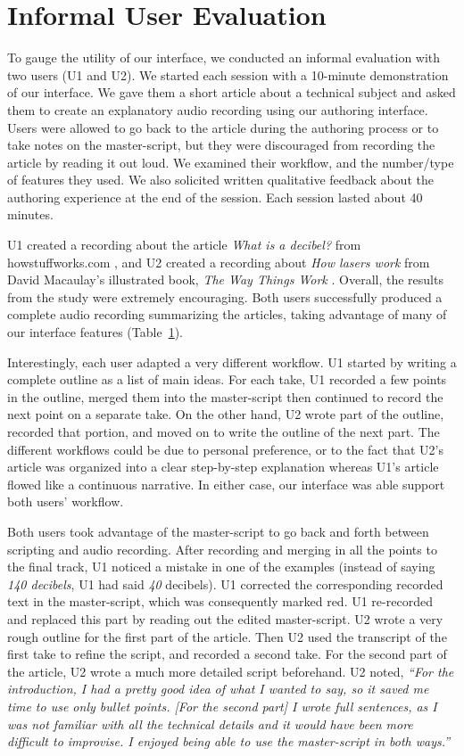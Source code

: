 \section{Informal User Evaluation}

To gauge the utility of our interface, we conducted an informal evaluation with two users (U1 and U2). We started each session with a 10-minute demonstration of our interface. We gave them a short article about a technical subject and asked them to create an explanatory audio recording using our authoring interface. Users were allowed to go back to the article during the authoring process or to take notes on the master-script, but they were discouraged from recording the article by reading it out loud. We examined their workflow, and the number/type of features they used. We also solicited written qualitative feedback about the authoring experience at the end of the session. Each session lasted about 40 minutes.

U1 created a recording about the article \textit{What is a decibel? } from howstuffworks.com \cite{}, and U2 created a recording about \textit{How lasers work} from David Macaulay's illustrated book, \textit{The Way Things Work} \cite{}. Overall, the results from the study were extremely encouraging. Both users successfully produced a complete audio recording summarizing the articles, taking advantage of many of our interface features (Table~\ref{}). 

Interestingly, each user adapted a very different workflow. U1 started by writing a complete outline as a list of main ideas. For each take, U1 recorded a few points in the outline, merged them into the master-script then continued to record the next point on a separate take. On the other hand, U2 wrote part of the outline, recorded that portion, and moved on to write the outline of the next part. The different workflows could be due to personal preference, or  to the fact that U2's article was organized into a clear step-by-step explanation whereas U1's article flowed like a continuous narrative. In either case, our interface was able support both users' workflow. 

Both users took advantage of the master-script to go back and forth between scripting and audio recording. After recording and merging in all the points
to the final track, U1 noticed a mistake in one of the examples
(instead of saying \textit{140 decibels}, U1 had said \textit{40}
decibels). U1 corrected the corresponding recorded text in the
master-script, which was consequently marked red. U1 re-recorded
and replaced this part by reading out the edited master-script.
U2 wrote a very rough outline for the first part of the article. Then U2 used the transcript of the first take to refine the script, and recorded a second take. For the second part of the article, U2 wrote a much more detailed script beforehand. U2 noted,  \textit{``For the introduction, I had a pretty good idea of what I wanted to say, so it saved me time to use only bullet points. [For the second part] I wrote full sentences, as I was not familiar with all the technical details and it would have been more difficult
to improvise. I enjoyed being able to use the master-script in both ways.''
}


